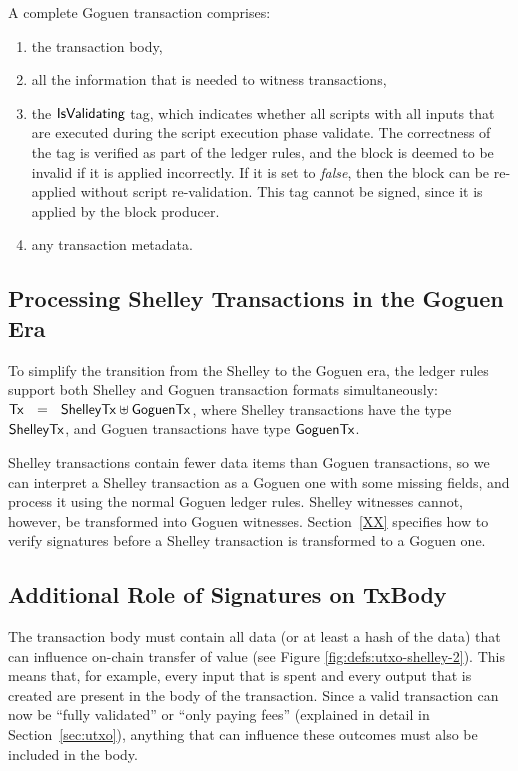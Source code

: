 A complete Goguen transaction comprises:

\begin{enumerate}
  \item the transaction body,
  \item all the information that is needed to witness transactions,
  \item the $\mathsf{IsValidating}$ tag, which indicates whether all scripts with all inputs
  that are executed during the script execution phase validate.
  The correctness of the tag is verified as part of the ledger rules, and the block is
  deemed to be invalid if it is applied incorrectly.
  If it is set to \emph{false}, then the block can be re-applied without script re-validation.
  This tag cannot be signed, since it is applied by the block producer.
  \item any transaction metadata.
\end{enumerate}


\subsection{Processing Shelley Transactions in the Goguen Era}

To simplify the transition from the Shelley to the Goguen era, the
ledger rules support both Shelley and Goguen transaction formats
simultaneously: $\mathsf{Tx} ~~=~~ \mathsf{ShelleyTx} \uplus \mathsf{GoguenTx}$, where
Shelley transactions have the type $\mathsf{ShelleyTx}$, and Goguen
transactions have type $\mathsf{GoguenTx}$.

Shelley transactions contain fewer data items than Goguen transactions, so we can interpret
a Shelley transaction as a Goguen one with some missing fields, and process it using the normal Goguen ledger
rules.  Shelley witnesses cannot, however, be transformed into Goguen witnesses.
Section~\ref{XX} specifies how to verify signatures before a
Shelley transaction is transformed to a Goguen one.

\subsection{Additional Role of Signatures on TxBody}
The transaction body must contain all data
(or at least a hash of the data) that can influence
on-chain transfer of value
(see Figure \ref{fig:defs:utxo-shelley-2}).
This means that, for example,
every input that is spent and every output that is created are present in the body of the transaction.
Since a valid transaction can now be ``fully validated'' or ``only paying
fees'' (explained in detail in Section~\ref{sec:utxo}), anything that
can influence these outcomes must also be included in the body.

